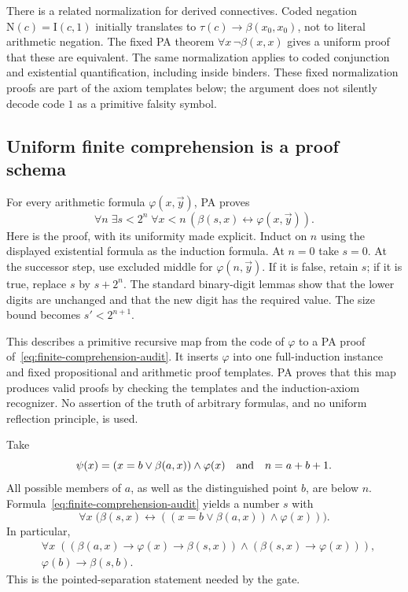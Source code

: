 There is a related normalization for derived connectives. Coded negation
$\mathrm N(c)=\mathrm I(c,1)$ initially translates to
$\tau(c)\to\beta(x_0,x_0)$, not to literal arithmetic negation.
The fixed PA theorem $\forall x\,\neg\beta(x,x)$ gives a uniform proof
that these are equivalent. The same normalization applies to coded
conjunction and existential quantification, including inside binders.
These fixed normalization proofs are part of the axiom templates below;
the argument does not silently decode code $1$ as a primitive falsity
symbol.

\subsection{Uniform finite comprehension is a proof schema}

For every arithmetic formula $\varphi(x,\vec y)$, PA proves
\begin{equation}\label{eq:finite-comprehension-audit}
 \forall n\;\exists s<2^n\;\forall x<n\,
       (\beta(s,x)\leftrightarrow\varphi(x,\vec y)).
\end{equation}
Here is the proof, with its uniformity made explicit. Induct on $n$ using
the displayed existential formula as the induction formula. At $n=0$ take
$s=0$. At the successor step, use excluded middle for
$\varphi(n,\vec y)$. If it is false, retain $s$; if it is true, replace $s$
by $s+2^n$. The standard binary-digit lemmas show that the lower digits are
unchanged and that the new digit has the required value. The size bound
becomes $s'<2^{n+1}$.

This describes a primitive recursive map from the code of $\varphi$ to a
PA proof of~\eqref{eq:finite-comprehension-audit}. It inserts $\varphi$ into
one full-induction instance and fixed propositional and arithmetic proof
templates. PA proves that this map produces valid proofs by checking the
templates and the induction-axiom recognizer. No assertion of the truth of
arbitrary formulas, and no uniform reflection principle, is used.

Take
\[
 \psi(x)= (x=b\lor\beta(a,x))\land\varphi(x)
 \quad\hbox{and}\quad n=a+b+1.
\]
All possible members of $a$, as well as the distinguished point $b$, are
below $n$. Formula~\eqref{eq:finite-comprehension-audit} yields a number $s$
with
\[
 \forall x\;\bigl(\beta(s,x)\leftrightarrow
       ((x=b\lor\beta(a,x))\land\varphi(x))\bigr).
\]
In particular,
\[
 \begin{split}
 &\forall x\;((\beta(a,x)\to\varphi(x)\to\beta(s,x))
       \land(\beta(s,x)\to\varphi(x))),\\
 &\varphi(b)\to\beta(s,b).
 \end{split}
\]
This is the pointed-separation statement needed by the gate.

